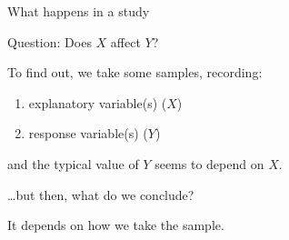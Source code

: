 \begin{frame}{What happens in a study}

    \alert{Question:} Does $X$ affect $Y$?

    \vspace{2em}

    To find out, we take some samples, recording:
      \begin{enumerate}
          \item explanatory variable(s) ($X$)
          \item response variable(s) ($Y$)
      \end{enumerate}
    and the typical value of $Y$ seems to depend on $X$.

    \vspace{2em}

    \ldots but then, what do we conclude?

    \vspace{2em}

    \alert{It depends} on how we take the sample.

\end{frame}

